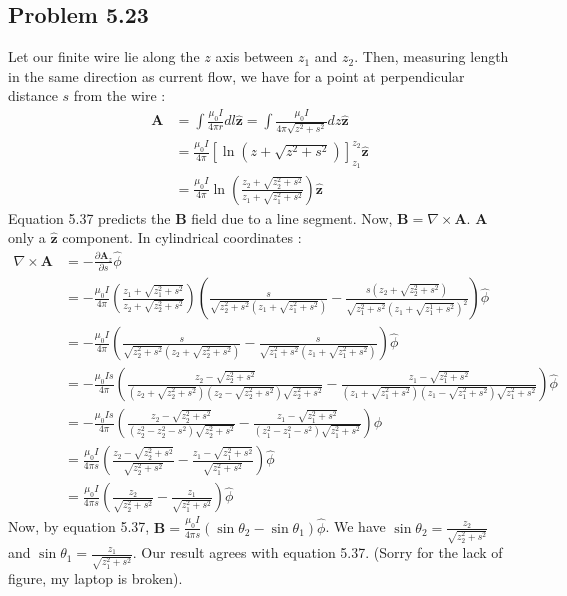 \documentclass{article}
\begin{document}
\subsection*{Problem 5.23}
Let our finite wire lie along the $z$ axis between $z_1$ and $z_2$. Then, measuring length in the same direction as current flow, we have for a point at perpendicular distance $s$ from the wire :
\begin{align*}
   \textbf{A} &= \int\frac{\mu_0I}{4\pi r}dl\hat{\textbf{z}} = \int\frac{\mu_0I}{4\pi \sqrt{z^2 + s^2}}dz \hat{\textbf{z}}  \\
   &= \frac{\mu_0I}{4\pi}\left[\ln{\left(z + \sqrt{z^2 + s^2}\right)}\right]_{z_1}^{z_2}\hat{\textbf{z}}\\
   &= \frac{\mu_0I}{4\pi}\ln\left(\frac{z_2 + \sqrt{z_2^2 + s^2}}{z_1 +\sqrt{z_1^2 + s^2}}\right)\hat{\textbf{z}}
\end{align*}
\bigskip
Equation 5.37 predicts the \textbf{B} field due to a line segment. Now, $\textbf{B} = \nabla \times \textbf{A}$. \textbf{A} only a $\hat{\textbf{z}}$ component. In cylindrical coordinates :
\begin{align*}
    \nabla \times \textbf{A} &= -\frac{\partial \textbf{A}_z}{\partial s }\hat{\phi}\\
    &= -\frac{\mu_0I}{4\pi}\left(\frac{z_1 + \sqrt{z_1^2 + s^2}}{z_2 + \sqrt{z_2^2 + s^2}}\right)\left(\frac{s}{\sqrt{z_2^2 + s^2}(z_1 + \sqrt{z_1^2+s^2})} - \frac{s(z_2+\sqrt{z_2^2+s^2})}{\sqrt{z_1^2 + s^2}(z_1 + \sqrt{z_1^1 + s^2})^2}\right)\hat{\phi}\\
    &= -\frac{\mu_0I}{4\pi}\left( \frac{s}{\sqrt{z_2^2 + s^2}(z_2+\sqrt{z_2^2+s^2})} - \frac{s}{\sqrt{z_1^2+s^2}(z_1+\sqrt{z_1^2+s^2})}\right)\hat{\phi}\\
    &= -\frac{\mu_0Is}{4\pi}\left(\frac{z_2 - \sqrt{z_2^2+s^2}}{(z_2 +\sqrt{z_2^2 + s^2} )(z_2 - \sqrt{z_2^2 + s^2})\sqrt{z_2^2+s^2}} - \frac{z_1 - \sqrt{z_1^2+s^2}}{(z_1 +\sqrt{z_1^2 + s^2} )(z_1 - \sqrt{z_1^2 + s^2})\sqrt{z_1^2+s^2}}\right)\hat{\phi}\\
    &= -\frac{\mu_0Is}{4\pi}\left(\frac{z_2 - \sqrt{z_2^2+s^2}}{(z_2^2 - z_2^2 - s^2)\sqrt{z_2^2+s^2}} - \frac{z_1 - \sqrt{z_1^2+s^2}}{(z_1^2 - z_1^2 - s^2)\sqrt{z_1^2+s^2}} \right)\hat{\phi}\\
    &= \frac{\mu_0I}{4\pi s}\left(\frac{z_2 - \sqrt{z_2^2 + s^2}}{\sqrt{z_2^2 + s^2}} - \frac{z_1 - \sqrt{z_1^2 + s^2}}{\sqrt{z_1^2 + s^2}}\right)\hat{\phi}\\
    &= \frac{\mu_0I}{4\pi s}\left(\frac{z_2}{\sqrt{z_2^2 + s^2}} - \frac{z_1}{\sqrt{z_1^2 + s^2}} \right)\hat{\phi}
\end{align*}
Now, by equation 5.37, $\textbf{B} = \frac{\mu_0I}{4\pi s}(\sin\theta_2 - \sin\theta_1)\hat{\phi}$. We have $\sin\theta_2 = \frac{z_2}{\sqrt{z_2^2 + s^2}}$ and $\sin\theta_1 = \frac{z_1}{\sqrt{z_1^2 + s^2}}$. Our result agrees with equation 5.37. (Sorry for the lack of figure, my laptop is broken).
\end{document}
